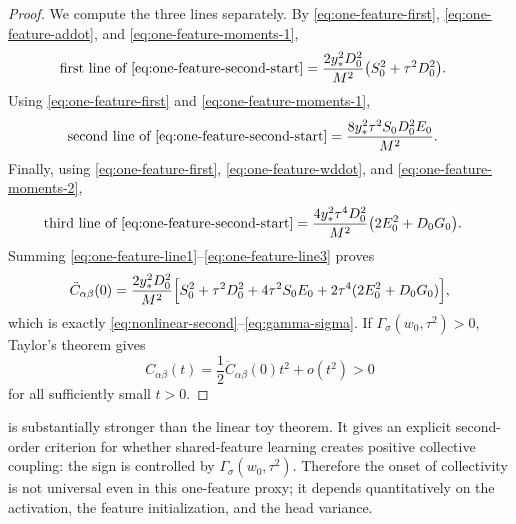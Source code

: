 \begin{proof}
We compute the three lines separately.
By \eqref{eq:one-feature-first}, \eqref{eq:one-feature-addot}, and \eqref{eq:one-feature-moments-1},
\begin{align}
  \text{first line of \eqref{eq:one-feature-second-start}}
  &=
  \frac{2y_*^2 D_0^2}{M^2}
  \bigl(
    S_0^2+\tau^2 D_0^2
  \bigr).
  \label{eq:one-feature-line1}
\end{align}
Using \eqref{eq:one-feature-first} and \eqref{eq:one-feature-moments-1},
\begin{align}
  \text{second line of \eqref{eq:one-feature-second-start}}
  &=
  \frac{8y_*^2 \tau^2 S_0 D_0^2 E_0}{M^2}.
  \label{eq:one-feature-line2}
\end{align}
Finally, using \eqref{eq:one-feature-first}, \eqref{eq:one-feature-wddot}, and \eqref{eq:one-feature-moments-2},
\begin{align}
  \text{third line of \eqref{eq:one-feature-second-start}}
  &=
  \frac{4y_*^2 \tau^4 D_0^2}{M^2}
  \bigl(
    2E_0^2+D_0G_0
  \bigr).
  \label{eq:one-feature-line3}
\end{align}
Summing \eqref{eq:one-feature-line1}--\eqref{eq:one-feature-line3} proves
\[
  \ddot C_{\alpha\beta}(0)
  =
  \frac{2y_*^2 D_0^2}{M^2}
  \Bigl[
    S_0^2
    +
    \tau^2 D_0^2
    +
    4\tau^2 S_0 E_0
    +
    2\tau^4(2E_0^2+D_0G_0)
  \Bigr],
\]
which is exactly \eqref{eq:nonlinear-second}--\eqref{eq:gamma-sigma}.
If $\Gamma_\sigma(w_0,\tau^2)>0$, Taylor's theorem gives
\[
  C_{\alpha\beta}(t)
  =
  \frac12 \ddot C_{\alpha\beta}(0)t^2 + o(t^2)
  >0
\]
for all sufficiently small $t>0$.
\end{proof}

\begin{remark}
 is substantially stronger than the linear toy theorem.
It gives an explicit second-order criterion for whether shared-feature learning creates positive collective coupling:
the sign is controlled by $\Gamma_\sigma(w_0,\tau^2)$.
Therefore the onset of collectivity is not universal even in this one-feature proxy;
it depends quantitatively on the activation, the feature initialization, and the head variance.
\end{remark}

